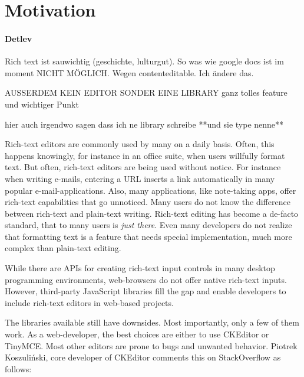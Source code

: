 


\section{Motivation}

\paragraph{Detlev} Rich text ist sauwichtig (geschichte, lulturgut). So was wie google docs ist im moment NICHT MÖGLICH. Wegen contenteditable. Ich ändere das.

AUSSERDEM KEIN EDITOR SONDER EINE LIBRARY ganz tolles feature und wichtiger Punkt

hier auch irgendwo sagen dass ich ne library schreibe **und sie type nenne**

Rich-text editors are commonly used by many on a daily basis. Often, this happens knowingly, for instance in an office suite, when users willfully format text. But often, rich-text editors are being used without notice. For instance when writing e-mails, entering a URL inserts a link automatically in many popular e-mail-applications. Also, many applications, like note-taking apps, offer rich-text capabilities that go unnoticed. Many users do not know the difference between rich-text and plain-text writing. Rich-text editing has become a de-facto standard, that to many users is \textit{just there}. Even many developers do not realize that formatting text is a feature that needs special implementation, much more complex than plain-text editing.

While there are APIs for creating rich-text input controls in many desktop programming environments, web-browsers do not offer native rich-text inputs. However, third-party JavaScript libraries fill the gap and enable developers to include rich-text editors in web-based projects.

The libraries available still have downsides. Most importantly, only a few of them work. As a web-developer, the best choices are either to use CKEditor or TinyMCE. Most other editors are prone to bugs and unwanted behavior. Piotrek Koszuli\'{n}ski, core developer of CKEditor comments this on StackOverflow as follows:

